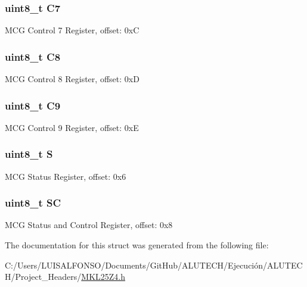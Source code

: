 \subsubsection[{C7}]{\setlength{\rightskip}{0pt plus 5cm}uint8\+\_\+t C7}\label{struct_m_c_g___mem_map_af43b800cd7ef121b64ecb21279141911}
M\+C\+G Control 7 Register, offset\+: 0x\+C \hypertarget{struct_m_c_g___mem_map_a3b00df5dfe47159247af492db046dd07}{}
\subsubsection[{C8}]{\setlength{\rightskip}{0pt plus 5cm}uint8\+\_\+t C8}\label{struct_m_c_g___mem_map_a3b00df5dfe47159247af492db046dd07}
M\+C\+G Control 8 Register, offset\+: 0x\+D \hypertarget{struct_m_c_g___mem_map_afcf64e260d0ed62eb0141dee036d0dd3}{}
\subsubsection[{C9}]{\setlength{\rightskip}{0pt plus 5cm}uint8\+\_\+t C9}\label{struct_m_c_g___mem_map_afcf64e260d0ed62eb0141dee036d0dd3}
M\+C\+G Control 9 Register, offset\+: 0x\+E \hypertarget{struct_m_c_g___mem_map_aef44b210af6af7cb40efdfd5469406c0}{}
\subsubsection[{S}]{\setlength{\rightskip}{0pt plus 5cm}uint8\+\_\+t S}\label{struct_m_c_g___mem_map_aef44b210af6af7cb40efdfd5469406c0}
M\+C\+G Status Register, offset\+: 0x6 \hypertarget{struct_m_c_g___mem_map_a994283cb179a11ded2d18c30c3710802}{}
\subsubsection[{S\+C}]{\setlength{\rightskip}{0pt plus 5cm}uint8\+\_\+t S\+C}\label{struct_m_c_g___mem_map_a994283cb179a11ded2d18c30c3710802}
M\+C\+G Status and Control Register, offset\+: 0x8 

The documentation for this struct was generated from the following file\+:\begin{DoxyCompactItemize}
\item 
C\+:/\+Users/\+L\+U\+I\+S\+A\+L\+F\+O\+N\+S\+O/\+Documents/\+Git\+Hub/\+A\+L\+U\+T\+E\+C\+H/\+Ejecución/\+A\+L\+U\+T\+E\+C\+H/\+Project\+\_\+\+Headers/\hyperlink{_m_k_l25_z4_8h}{M\+K\+L25\+Z4.\+h}\end{DoxyCompactItemize}
